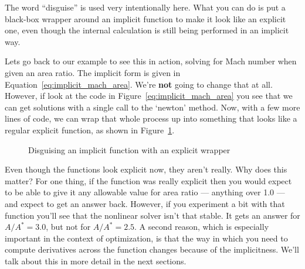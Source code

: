 \documentclass[conf]{new-aiaa}
\begin{document}
    The word ``disguise'' is used very intentionally here. What you can do is put a black-box wrapper around an implicit function to make it look like an explicit one, even though the internal calculation is still being performed in an implicit way. 

    Lets go back to our example to see this in action, solving for Mach number when given an area ratio. 
    The implicit form is given in Equation~\ref{eq:implicit_mach_area}. 
    We're \textbf{not} going to change that at all. 
    However, if look at the code in Figure~\ref{eq:implicit_mach_area} you see that we can get solutions with a single call to the `newton' method. 
    Now, with a few more lines of code, we can wrap that whole process up into something that looks like a regular explicit function, as shown in Figure~\ref{fig:mach-area-fake-explicit}. 
    \begin{figure}[H]
        \centering
        
        \caption{Disguising an implicit function with an explicit wrapper}
        \label{fig:mach-area-fake-explicit}
    \end{figure}

    Even though the functions look explicit now, they aren't really. 
    Why does this matter? 
    For one thing, if the function was really explicit then you would expect to be able to give it any allowable value for area ratio --- anything over 1.0 --- and expect to get an answer back. 
    However, if you experiment a bit with that function you'll see that the nonlinear solver isn't that stable. 
    It gets an answer for $A/A^*=3.0$, but not for $A/A^*=2.5$. 
    A second reason, which is especially important in the context of optimization, is that the way in which you need to compute derivatives across the function changes because of the implicitness. 
    We'll talk about this in more detail in the next sections. 





\end{document}
